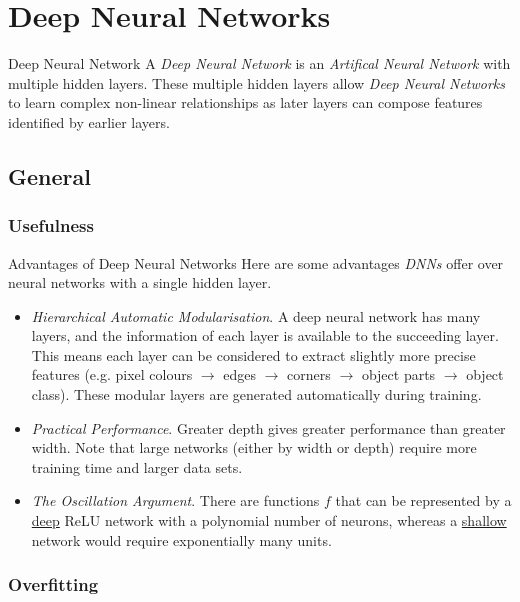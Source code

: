 \documentclass[11pt,a4paper]{article}
\begin{document}
\section{Deep Neural Networks}

  \begin{definition}{Deep Neural Network}
    A \textit{Deep Neural Network} is an \textit{Artifical Neural Network} with multiple hidden layers. These multiple hidden layers allow \textit{Deep Neural Networks} to learn complex non-linear relationships as later layers can compose features identified by earlier layers.
  \end{definition}

\subsection{General}

\subsubsection{Usefulness}

  \begin{remark}{Advantages of Deep Neural Networks}
    Here are some advantages \textit{DNNs} offer over neural networks with a single hidden layer.
    \begin{itemize}
      \item \textit{Hierarchical Automatic Modularisation}. A deep neural network has many layers, and the information of each layer is available to the succeeding layer. This means each layer can be considered to extract slightly more precise features (e.g. pixel colours $\to$ edges $\to$ corners $\to$ object parts $\to$ object class). These modular layers are generated automatically during training.
      \item \textit{Practical Performance}. Greater depth gives greater performance than greater width. Note that large networks (either by width or depth) require more training time and larger data sets.
      \item \textit{The Oscillation Argument}. There are functions $f$ that can be represented by a \underline{deep} ReLU network with a polynomial number of neurons, whereas a \underline{shallow} network would require exponentially many units.
    \end{itemize}
  \end{remark}

\subsubsection{Overfitting}
\end{document}
